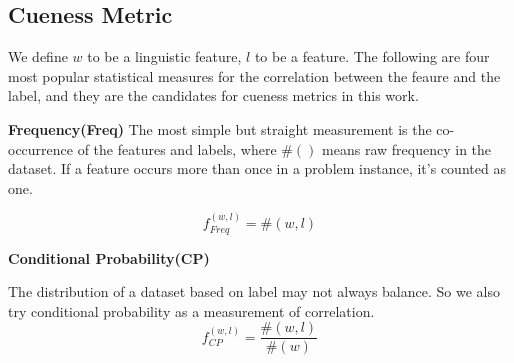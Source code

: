 %



\subsection{Cueness Metric}
We define $w$ to be a linguistic feature, $l$ to be a feature. The following are
four most popular statistical measures for the correlation between the feaure
and the label, and they are the candidates for cueness metrics in this work.

\noindent\textbf{Frequency(Freq)}
The most simple but straight measurement is the co-occurrence of the
features and labels, where $\#()$ means raw frequency in the dataset.
If a feature occurs more than once in a problem instance, it's counted as
one.

\begin{equation}
    f_{Freq}^{(w,l)} = \#(w, l)
\end{equation}

\noindent\textbf{Conditional Probability(CP)}

The distribution of a dataset based on label may not always balance.
So we also try conditional probability as a measurement of correlation.
\begin{equation}
    f_{CP}^{(w,l)} = \frac{\#(w, l)}{\#(w)}
\end{equation}


